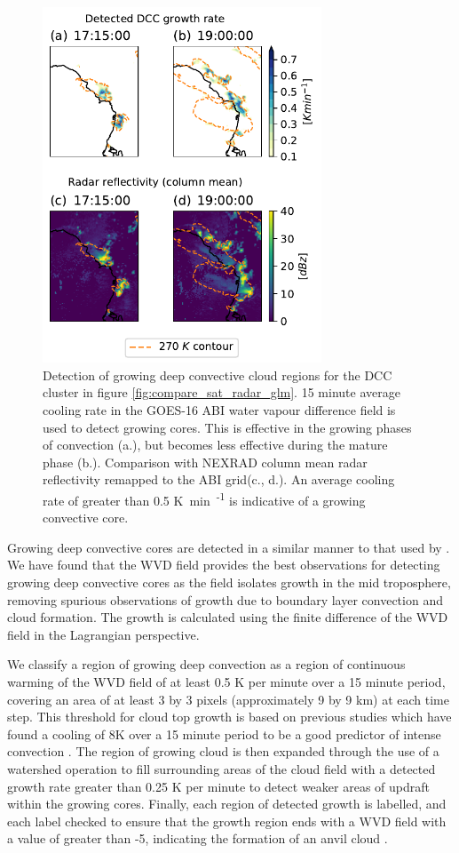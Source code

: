 \documentclass[amt, manuscript]{copernicus}
\begin{document}
\begin{figure}[t]
    \includegraphics[width=8.3cm]{figure06.pdf}
    \caption{Detection of growing deep convective cloud regions for the DCC cluster in figure \ref{fig:compare_sat_radar_glm}. 15 minute average cooling rate in the GOES-16 ABI water vapour difference field is used to detect growing cores. This is effective in the growing phases of convection (a.), but becomes less effective during the mature phase (b.). Comparison with NEXRAD column mean radar reflectivity remapped to the ABI grid(c., d.). An average cooling rate of greater than 0.5 \unit{K min\textsuperscript{-1}} is indicative of a growing convective core.}
    \label{fig:core_detection}
\end{figure}

Growing deep convective cores are detected in a similar manner to that used by \citet{zinner_cb-tram:_2008}.
We have found that the WVD field provides the best observations for detecting growing deep convective cores as the field isolates growth in the mid troposphere, removing spurious observations of growth due to boundary layer convection and cloud formation.
The growth is calculated using the finite difference of the WVD field in the Lagrangian perspective.

We classify a region of growing deep convection as a region of continuous warming of the WVD field of at least 0.5 \unit{K} per minute over a 15 minute period, covering an area of at least 3 by 3 pixels (approximately 9 by 9 km) at each time step.
This threshold for cloud top growth is based on previous studies which have found a cooling of 8\unit{K} over a 15 minute period to be a good predictor of intense convection \citep{roberts_nowcasting_2003, hartung_intercomparison_2013}.
The region of growing cloud is then expanded through the use of a watershed operation to fill surrounding areas of the cloud field with a detected growth rate greater than 0.25 \unit{K} per minute to detect weaker areas of updraft within the growing cores.
Finally, each region of detected growth is labelled, and each label checked to ensure that the growth region ends with a WVD field with a value of greater than -5, indicating the formation of an anvil cloud \citep{muller_role_2018}.
\end{document}
